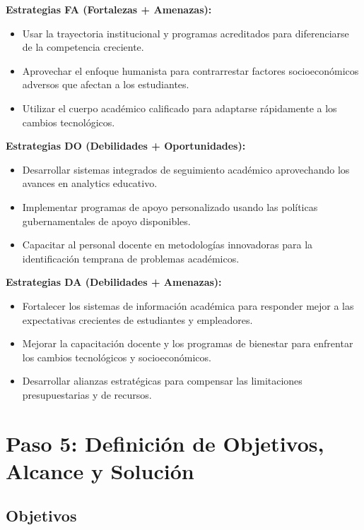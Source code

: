 \documentclass[12pt,letterpaper]{report}
\begin{document}
\textbf{Estrategias FA (Fortalezas + Amenazas):}
\begin{itemize}
    \item Usar la trayectoria institucional y programas acreditados para diferenciarse de la competencia creciente.
    \item Aprovechar el enfoque humanista para contrarrestar factores socioeconómicos adversos que afectan a los estudiantes.
    \item Utilizar el cuerpo académico calificado para adaptarse rápidamente a los cambios tecnológicos.
\end{itemize}

\textbf{Estrategias DO (Debilidades + Oportunidades):}
\begin{itemize}
    \item Desarrollar sistemas integrados de seguimiento académico aprovechando los avances en analytics educativo.
    \item Implementar programas de apoyo personalizado usando las políticas gubernamentales de apoyo disponibles.
    \item Capacitar al personal docente en metodologías innovadoras para la identificación temprana de problemas académicos.
\end{itemize}

\textbf{Estrategias DA (Debilidades + Amenazas):}
\begin{itemize}
    \item Fortalecer los sistemas de información académica para responder mejor a las expectativas crecientes de estudiantes y empleadores.
    \item Mejorar la capacitación docente y los programas de bienestar para enfrentar los cambios tecnológicos y socioeconómicos.
    \item Desarrollar alianzas estratégicas para compensar las limitaciones presupuestarias y de recursos.
\end{itemize}

\section{Paso 5: Definición de Objetivos, Alcance y Solución}

\subsection{Objetivos}
\end{document}
